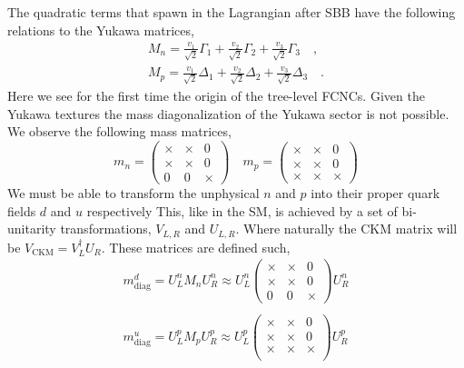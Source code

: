 The quadratic terms that spawn in the Lagrangian after SBB have the following relations to the Yukawa matrices,
% 
\begin{equation}
\begin{split}
M_n = \frac{v_1}{\sqrt{2}} \Gamma_1 +  \frac{v_2}{\sqrt{2}} \Gamma_2 +  \frac{v_3}{\sqrt{2}} \Gamma_3  \quad , \\ 
M_p = \frac{v_1}{\sqrt{2}} \Delta_1 +  \frac{v_2}{\sqrt{2}} \Delta_2 +  \frac{v_3}{\sqrt{2}} \Delta_3   \quad .
\end{split}
\end{equation}
%
Here we see for the first time the origin of the tree-level FCNCs. 
%
Given the Yukawa textures the mass diagonalization of the Yukawa sector is not possible. We observe the following mass matrices, 
\begin{equation}
m_n = \begin{pmatrix}
\times & \times & 0 \\
\times & \times & 0 \\
0 & 0 & \times 
\end{pmatrix} 
\quad 
m_p=\begin{pmatrix}
\times & \times & 0 \\
\times & \times & 0 \\
\times & \times & \times 
\end{pmatrix}
\end{equation}
We must be able to transform the unphysical $n$ and $p$ into their proper quark fields $d$ and $u$ respectively 
%
This, like in the SM, is achieved by a set of bi-unitarity transformations, $V_{L,R}$ and $U_{L,R}$. Where naturally the CKM matrix will be $V_{\text{CKM}} = V_L^\dagger U_R$. These matrices are defined such, 
\begin{equation}
\begin{split}
m^d_{\text{diag}} = U_L^n M_n U_R^n \approx U_L^n \begin{pmatrix}
\times & \times & 0 \\
\times & \times & 0 \\
0 & 0 & \times 
\end{pmatrix}  U_R^n  \\
\\ 
m^u_{\text{diag}} = U_L^p  M_p U_R^p \approx U_L^p \begin{pmatrix}
\times & \times & 0 \\
\times & \times & 0 \\
\times & \times & \times \\ \end{pmatrix} U_R^p 
\end{split} 
\end{equation}
